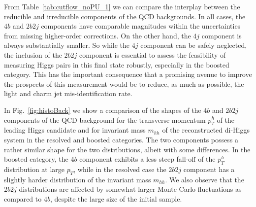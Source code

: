  From Table~\ref{tab:cutflow_noPU_1} we
 can compare the interplay
 between the reducible and irreducible components of the
 QCD backgrounds.
 In all cases, the $4b$ and $2b2j$ components have comparable
 magnitudes within the uncertainties from missing higher-order
 corrections.
 On the other hand, the $4j$ component
is always substantially smaller.
  So while the $4j$ component can be safely
 neglected, the inclusion of the
 $2b2j$ component is essential to assess the feasibility
 of measuring Higgs pairs in this final state robustly,
 especially
 in the boosted category.
 This has the important
 consequence that a promising avenue to improve the prospects
 of this measurement would be to reduce, as much as possible,
 the light and charm jet mis-identification rate.

 In Fig.~\ref{fig:histoBack} we show a
 comparison
    of the shapes of the $4b$ and $2b2j$
    components of the QCD background for the transverse momentum
    $p_T^h$ of the leading
Higgs candidate and for invariant
mass $m_{hh}$ of the
    reconstructed di-Higgs system in the resolved
    and boosted  categories.
    The two components possess a rather similar shape
    for the two distributions, albeit with some 
    differences.
    In the boosted
    category, the $4b$ component exhibits a less steep fall-off of
    the $p_T^h$ distribution at large $p_T$,
    while in the resolved case
    the $2b2j$ component has a slightly harder
    distribution of the  invariant
    mass $m_{hh}$.
%
    We also observe that the $2b2j$ distributions
    are affected by somewhat larger
    Monte Carlo fluctuations as compared to $4b$, despite the large size
of the initial sample.
%

